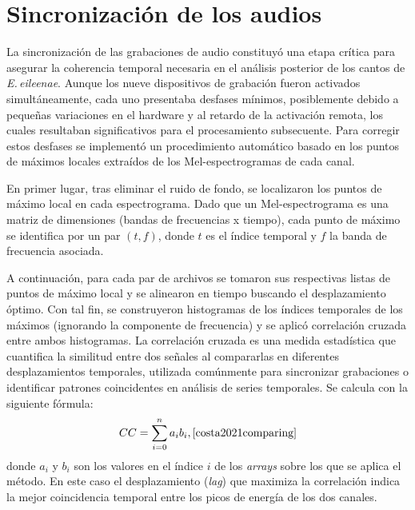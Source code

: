 
\section{Sincronización de los audios}
\label{sec:sincronizacion}

La sincronización de las grabaciones de audio constituyó una 
etapa crítica para asegurar la coherencia temporal necesaria en 
el análisis posterior de los cantos de \emph{E.\,eileenae}. 
Aunque los nueve dispositivos de grabación fueron activados 
simultáneamente, cada uno presentaba desfases mínimos, posiblemente 
debido a pequeñas variaciones en el hardware y al retardo de 
la activación remota, los cuales 
resultaban significativos para el procesamiento subsecuente. 
Para corregir estos 
desfases se implementó un procedimiento automático basado en 
los puntos de máximos locales extraídos de los Mel-espectrogramas de cada 
canal.

En primer lugar, tras eliminar el ruido de fondo, se localizaron 
los puntos de máximo local en cada espectrograma. Dado que un 
Mel-espectrograma es una matriz de dimensiones (bandas de frecuencias x tiempo), 
cada punto de máximo se identifica por un par \((t,f)\), donde 
\(t\) es el índice temporal y \(f\) la banda de frecuencia 
asociada.

A continuación, para cada par de archivos se tomaron sus 
respectivas listas de puntos de máximo local y se alinearon en 
tiempo buscando el desplazamiento óptimo. Con tal fin, se 
construyeron histogramas de los índices temporales de los 
máximos (ignorando la componente de frecuencia) y se aplicó 
correlación cruzada entre ambos histogramas. 
La correlación cruzada es una medida estadística que cuantifica 
la similitud entre dos señales al compararlas en diferentes 
desplazamientos temporales, utilizada comúnmente para sincronizar 
grabaciones o identificar patrones coincidentes en análisis de 
series temporales. Se calcula con la siguiente fórmula:
\begin{equation*}
	CC = \sum_{i=0}^{n} a_{i}b_{i},     \cite{costa2021comparing}
\end{equation*} 
donde $a_i$ y $b_i$ son los valores en el índice $i$ de los \textit{arrays} sobre los que se aplica el método.
En este caso el desplazamiento (\emph{lag}) que maximiza la correlación 
indica la mejor coincidencia temporal entre los picos de energía 
de los dos canales.

